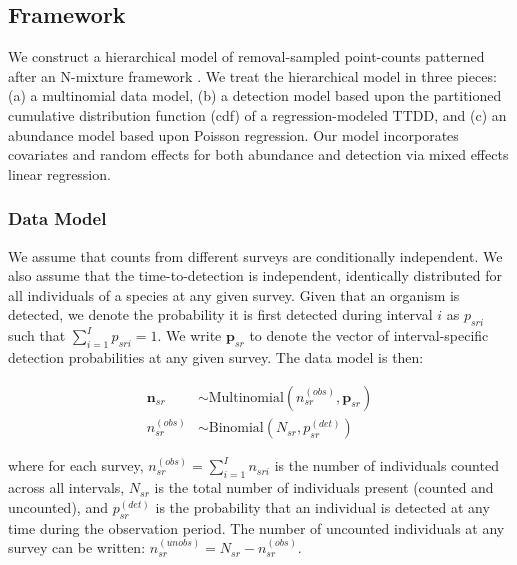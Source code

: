\documentclass[useAMS,usenatbib,referee,12pt]{article}
\begin{document}
\subsection{Framework}

We construct a hierarchical model of removal-sampled point-counts patterned after an N-mixture framework \citep{Wyatt2002, Royle2004NMixture}.  We treat the hierarchical model in three pieces: (a) a multinomial data model, (b) a detection model based upon the partitioned cumulative distribution function (cdf) of a regression-modeled TTDD, and (c) an abundance model based upon Poisson regression.  Our model incorporates covariates and random effects for both abundance and detection via mixed effects linear regression.

\subsubsection{Data Model}
We assume that counts from different surveys are conditionally independent.  We also assume that the time-to-detection is independent, identically distributed for all individuals of a species at any given survey.  Given that an organism is detected, we denote the probability it is first detected during interval $i$ as $p_{sri}$ such that $\sum_{i=1}^I p_{sri} = 1$.  We write $\textbf{p}_{sr}$ to denote the vector of interval-specific detection probabilities at any given survey.  The data model is then:

\begin{align}\label{eq:datamodel}
\textbf{n}_{sr} &\sim \mbox{Multinomial}\left(n_{sr}^{(obs)}, \textbf{p}_{sr}\right)\\
n_{sr}^{(obs)} &\sim \mbox{Binomial}\left(N_{sr}, p_{sr}^{(det)}\right)
\end{align}

where for each survey, $n_{sr}^{(obs)} = \sum_{i=1}^I n_{sri}$ is the number of individuals counted across all intervals, $N_{sr}$ is the total number of individuals present (counted and uncounted), and $p_{sr}^{(det)}$ is the probability that an individual is detected at any time during the observation period.  The number of uncounted individuals at any survey can be written: $n_{sr}^{(unobs)} = N_{sr} - n_{sr}^{(obs)}$.
\end{document}
